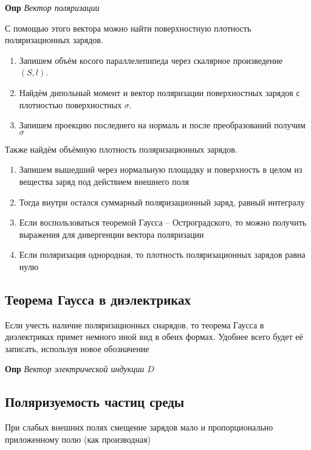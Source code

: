 \documentclass[a4paper, 14pt]{article}
\begin{document}
    \textbf{Опр} \textit{Вектор поляризации}
    
    С помощью этого вектора можно найти поверхностную плотность поляризационных зарядов.
    
    \begin{enumerate}
        \item Запишем объём косого параллелепипеда через скалярное произведение $(S, l)$.
        \item Найдём дипольный момент и вектор поляризации поверхностных зарядов с плотностью поверхностных $\sigma$.
        \item Запишем проекцию последнего на нормаль и после преобразований получим $\sigma$
    \end{enumerate}
    
    Также найдём объёмную плотность поляризационных зарядов.
    
    \begin{enumerate}
        \item Запишем вышедший через нормальную площадку и поверхность в целом из вещества заряд под действием
        внешнего поля
        \item Тогда внутри остался суммарный поляризационный заряд, равный интегралу
        \item Если воспользоваться теоремой Гаусса -- Остроградского, то можно получить выражения для дивергенции
        вектора поляризации
        \item Если поляризация однородная, то плотность поляризационных зарядов равна нулю
    \end{enumerate}
    
    \subsection{Теорема Гаусса в диэлектриках}
    
    Если учесть наличие поляризационных снарядов, то теорема Гаусса в диэлектриках примет немного иной вид в обеих
    формах.
    Удобнее всего будет её записать, используя новое обозначение
    
    \textbf{Опр} \textit{Вектор электрической индукции $D$}
    
    \subsection{Поляризуемость частиц среды}
    
    При слабых внешних полях смещение зарядов мало и пропорционально приложенному полю (как производная)
    
\end{document}
